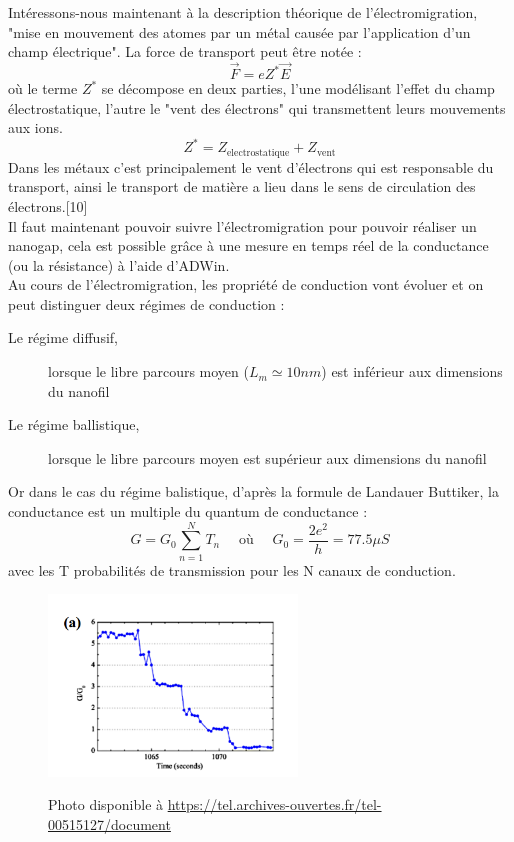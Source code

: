 Intéressons-nous maintenant à la description théorique de l'électromigration, "mise en mouvement des atomes par un métal causée par l'application d'un champ électrique". La force de transport peut être notée :
\[\vec{F}=e Z^* \vec{E}\]
où le terme $Z^*$ se décompose en deux parties, l'une modélisant l'effet du champ électrostatique, l'autre le "vent des électrons" qui transmettent leurs mouvements aux ions.
\[Z^* = Z_{\text{electrostatique}} + Z_{\text{vent}}\]
Dans les métaux c'est principalement le vent d'électrons qui est responsable du transport, ainsi le transport de matière a lieu dans le sens de circulation des électrons.[10]\\

Il faut maintenant pouvoir suivre l'électromigration pour pouvoir réaliser un nanogap, cela est possible grâce à une mesure en temps réel de la conductance (ou la résistance) à l'aide d'ADWin.\\

Au cours de l'électromigration, les propriété de conduction vont évoluer et on peut distinguer deux régimes de conduction :
\begin{description}
    \item[Le régime diffusif,] lorsque le libre parcours moyen ($L_m \simeq 10nm$) est inférieur aux dimensions du nanofil
    \item[Le régime ballistique,] lorsque le libre parcours moyen est supérieur aux dimensions du nanofil
\end{description}

Or dans le cas du régime balistique, d'après la formule de Landauer Buttiker, la conductance est un multiple du quantum de conductance :
\[G = G_0 \sum_{n=1}^N T_n \quad \text{ où } \quad G_0 = \frac{2e^2}{h} = 77.5 \mu S\]
avec les T probabilités de transmission pour les N canaux de conduction.
\begin{figure}[h]
    \begin{center}
        \includegraphics[width=250px]{Images/Electromigration_graphe}
        \caption{}
        Photo disponible à \url{https://tel.archives-ouvertes.fr/tel-00515127/document}
        \label{fig:}
    \end{center}
\end{figure}

